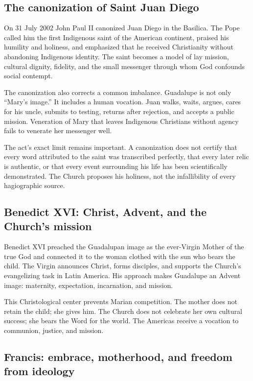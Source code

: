 \subsection{The canonization of Saint Juan Diego}

On 31 July 2002 John Paul II canonized Juan Diego in the Basilica. The Pope called him the first Indigenous saint of the American continent, praised his humility and holiness, and emphasized that he received Christianity without abandoning Indigenous identity. The saint becomes a model of lay mission, cultural dignity, fidelity, and the small messenger through whom God confounds social contempt.

The canonization also corrects a common imbalance. Guadalupe is not only “Mary's image.” It includes a human vocation. Juan walks, waits, argues, cares for his uncle, submits to testing, returns after rejection, and accepts a public mission. Veneration of Mary that leaves Indigenous Christians without agency fails to venerate her messenger well.

The act's exact limit remains important. A canonization does not certify that every word attributed to the saint was transcribed perfectly, that every later relic is authentic, or that every event surrounding his life has been scientifically demonstrated. The Church proposes his holiness, not the infallibility of every hagiographic source.

\subsection{Benedict XVI: Christ, Advent, and the Church's mission}

Benedict XVI preached the Guadalupan image as the ever-Virgin Mother of the true God and connected it to the woman clothed with the sun who bears the child. The Virgin announces Christ, forms disciples, and supports the Church's evangelizing task in Latin America. His approach makes Guadalupe an Advent image: maternity, expectation, incarnation, and mission.

This Christological center prevents Marian competition. The mother does not retain the child; she gives him. The Church does not celebrate her own cultural success; she bears the Word for the world. The Americas receive a vocation to communion, justice, and mission.

\subsection{Francis: embrace, motherhood, and freedom from ideology}

